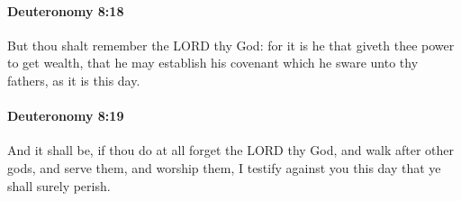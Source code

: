 		\paragraph{Deuteronomy 8:18} %
			\label{DEUTERONOMY-8-18}

			But thou shalt remember the LORD thy God: for it is he that giveth thee power to get wealth, that he may establish his covenant which he sware unto thy fathers, as it is this day.


		\paragraph{Deuteronomy 8:19} %
			\label{DEUTERONOMY-8-19}

			And it shall be, if thou do at all forget the LORD thy God, and walk after other gods, and serve them, and worship them, I testify against you this day that ye shall surely perish.

